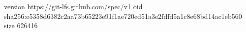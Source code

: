 version https://git-lfs.github.com/spec/v1
oid sha256:e5358d6382c2aa73b65223e91f1ae720ed51a3e2fdfd5a1c8e68bd14ac1eb560
size 626416
